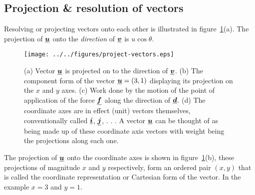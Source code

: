 



\addtolength{\topmargin}{-0.7 cm}
\setlength{\columnsep}{22pt}


\subsection*{Projection \& resolution of vectors}
Resolving or projecting vectors onto each other is illustrated in
figure~\ref{fig:project-vectors}(a).  The projection of $\mathit{\underline{\boldsymbol{u}}}$ onto the \emph{direction} of $\mathit{\underline{\boldsymbol{v}}}$ is $u \cos\theta$.
\begin{figure}[h!]
\centering
\texttt{[image: ../../figures/project-vectors.eps]}
\caption{(a) Vector $\mathit{\underline{\boldsymbol{u}}}$ is projected on to the direction of $\mathit{\underline{\boldsymbol{v}}}$.  (b) The component form of the vector $\mathit{\underline{\boldsymbol{u}}} = (3,1)$ displaying its projection on the $x$ and $y$ axes. (c) Work done by the motion of the point of application of the force $\mathit{\underline{\boldsymbol{f}}}$ along the direction of $\mathit{\underline{\boldsymbol{d}}}$. (d) The coordinate axes are in effect (unit) vectors themselves, conventionally called $\mathit{\underline{\boldsymbol{i}}}$, $\mathit{\underline{\boldsymbol{j}}}$, . . . A vector $\mathit{\underline{\boldsymbol{u}}}$ can be thought of as being made up of these coordinate axis vectors with weight being the projections along each one. }\label{fig:project-vectors}
\end{figure}
The projection of $\mathit{\underline{\boldsymbol{u}}}$ onto the coordinate axes is shown in figure~\ref{fig:project-vectors}(b), these projections of magnitude $x$ and $y$ respectively, form an ordered pair $(x,y)$ that is called the coordinate representation or Cartesian form of the vector.  In the example $x=3$ and $y=1$.
